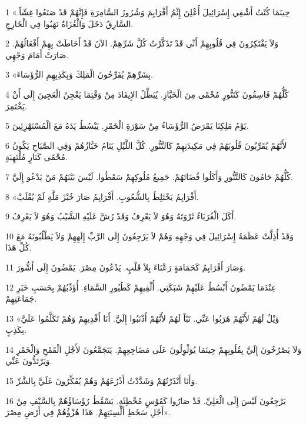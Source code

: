\par 1 «حِينَمَا كُنْتُ أَشْفِي إِسْرَائِيلَ أُعْلِنَ إِثْمُ أَفْرَايِمَ وَشُرُورُ السَّامِرَةِ فَإِنَّهُمْ قَدْ صَنَعُوا غِشّاً. السَّارِقُ دَخَلَ وَالْغُزَاةُ نَهَبُوا فِي الْخَارِجِ.
\par 2 وَلاَ يَفْتَكِرُونَ فِي قُلُوبِهِمْ أَنِّي قَدْ تَذَكَّرْتُ كُلَّ شَرِّهِمْ. الآنَ قَدْ أَحَاطَتْ بِهِمْ أَفْعَالُهُمْ. صَارَتْ أَمَامَ وَجْهِي.
\par 3 «بِشَرِّهِمْ يُفَرِّحُونَ الْمَلِكَ وَبِكَذِبِهِمِ الرُّؤَسَاءَ.
\par 4 كُلُّهُمْ فَاسِقُونَ كَتَنُّورٍ مُحْمًى مِنَ الْخَبَّازِ. يُبَطِّلُ الإِيقَادَ مِنْ وَقْتِمَا يَعْجِنُ الْعَجِينَ إِلَى أَنْ يَخْتَمِرَ.
\par 5 يَوْمُ مَلِكِنَا يَمْرَضُ الرُّؤَسَاءُ مِنْ سَوْرَةِ الْخَمْرِ. يَبْسُطُ يَدَهُ مَعَ الْمُسْتَهْزِئِينَ.
\par 6 لأَنَّهُمْ يُقَرِّبُونَ قُلُوبَهُمْ فِي مَكِيدَتِهِمْ كَالتَّنُّورِ. كُلَّ اللَّيْلِ يَنَامُ خَبَّازُهُمْ وَفِي الصَّبَاحِ يَكُونُ مُحْمًى كَنَارٍ مُلْتَهِبَةٍ.
\par 7 كُلُّهُمْ حَامُونَ كَالتَّنُّورِ وَأَكَلُوا قُضَاتَهُمْ. جَمِيعُ مُلُوكِهِمْ سَقَطُوا. لَيْسَ بَيْنَهُمْ مَنْ يَدْعُو إِلَيَّ.
\par 8 «أَفْرَايِمُ يَخْتَلِطُ بِالشُّعُوبِ. أَفْرَايِمُ صَارَ خُبْزَ مَلَّةٍ لَمْ يُقْلَبْ.
\par 9 أَكَلَ الْغُرَبَاءُ ثَرْوَتَهُ وَهُوَ لاَ يَعْرِفُ وَقَدْ رُشَّ عَلَيْهِ الشَّيْبُ وَهُوَ لاَ يَعْرِفُ.
\par 10 وَقَدْ أُذِلَّتْ عَظَمَةُ إِسْرَائِيلَ فِي وَجْهِهِ وَهُمْ لاَ يَرْجِعُونَ إِلَى الرَّبِّ إِلَهِهِمْ وَلاَ يَطْلُبُونَهُ مَعَ كُلِّ هَذَا.
\par 11 وَصَارَ أَفْرَايِمُ كَحَمَامَةٍ رَعْنَاءَ بِلاَ قَلْبٍ. يَدْعُونَ مِصْرَ. يَمْضُونَ إِلَى أَشُّورَ.
\par 12 عِنْدَمَا يَمْضُونَ أَبْسُطُ عَلَيْهِمْ شَبَكَتِي. أُلْقِيهِمْ كَطُيُورِ السَّمَاءِ. أُؤَدِّبُهُمْ بِحَسَبِ خَبَرِ جَمَاعَتِهِمْ.
\par 13 «وَيْلٌ لَهُمْ لأَنَّهُمْ هَرَبُوا عَنِّي. تَبّاً لَهُمْ لأَنَّهُمْ أَذْنَبُوا إِلَيَّ. أَنَا أَفْدِيهِمْ وَهُمْ تَكَلَّمُوا عَلَيَّ بِكَذِبٍ.
\par 14 وَلاَ يَصْرُخُونَ إِلَيَّ بِقُلُوبِهِمْ حِينَمَا يُوَلْوِلُونَ عَلَى مَضَاجِعِهِمْ. يَتَجَمَّعُونَ لأَجْلِ الْقَمْحِ وَالْخَمْرِ وَيَرْتَدُّونَ عَنِّي.
\par 15 وَأَنَا أَنْذَرْتُهُمْ وَشَدَّدْتُ أَذْرُعَهُمْ وَهُمْ يُفَكِّرُونَ عَلَيَّ بِالشَّرِّ.
\par 16 يَرْجِعُونَ لَيْسَ إِلَى الْعَلِيِّ. قَدْ صَارُوا كَقَوْسٍ مُخْطِئَةٍ. يَسْقُطُ رُؤَسَاؤُهُمْ بِالسَّيْفِ مِنْ أَجْلِ سَخَطِ أَلْسِنَتِهِمْ. هَذَا هُزْؤُهُمْ فِي أَرْضِ مِصْرَ».

